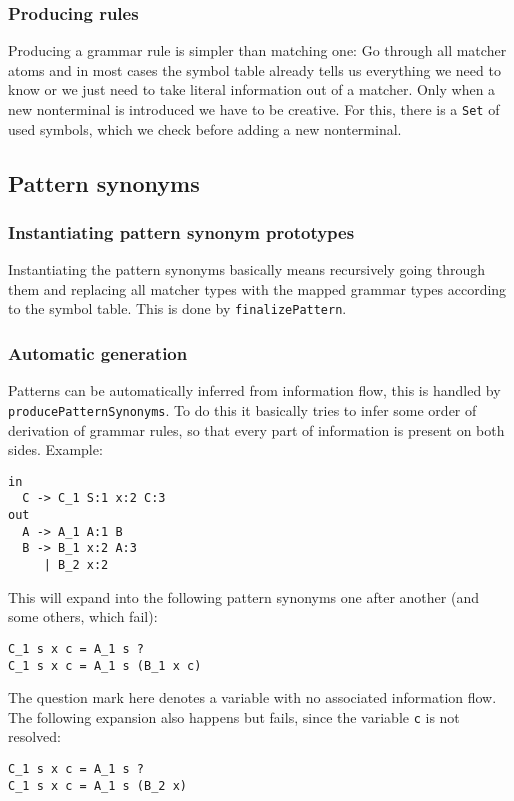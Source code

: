 \documentclass[a4paper]{article}
\begin{document}
\subsubsection{Producing rules}
Producing a grammar rule is simpler than matching one: Go through all matcher atoms and in most cases the symbol table already tells us everything we need to know or we just need to take literal information out of a matcher. Only when a new nonterminal is introduced we have to be creative. For this, there is a \lstinline{Set} of used symbols, which we check before adding a new nonterminal.

\subsection{Pattern synonyms}
\subsubsection{Instantiating pattern synonym prototypes}
Instantiating the pattern synonyms basically means recursively going through them and replacing all matcher types with the mapped grammar types according to the symbol table. This is done by \lstinline{finalizePattern}.

\subsubsection{Automatic generation}
Patterns can be automatically inferred from information flow, this is handled by \lstinline{producePatternSynonyms}. To do this it basically tries to infer some order of derivation of grammar rules, so that every part of information is present on both sides. Example:
\begin{lstlisting}[language=transformer]
in
  C -> C_1 S:1 x:2 C:3
out
  A -> A_1 A:1 B
  B -> B_1 x:2 A:3
     | B_2 x:2
\end{lstlisting}
This will expand into the following pattern synonyms one after another (and some others, which fail):
\begin{lstlisting}[language=transformer]
C_1 s x c = A_1 s ?              
C_1 s x c = A_1 s (B_1 x c)
\end{lstlisting}
The question mark here denotes a variable with no associated information flow. The following expansion also happens but fails, since the variable \verb|c| is not resolved:
\begin{lstlisting}[language=transformer]
C_1 s x c = A_1 s ?
C_1 s x c = A_1 s (B_2 x)
\end{lstlisting}
\end{document}
